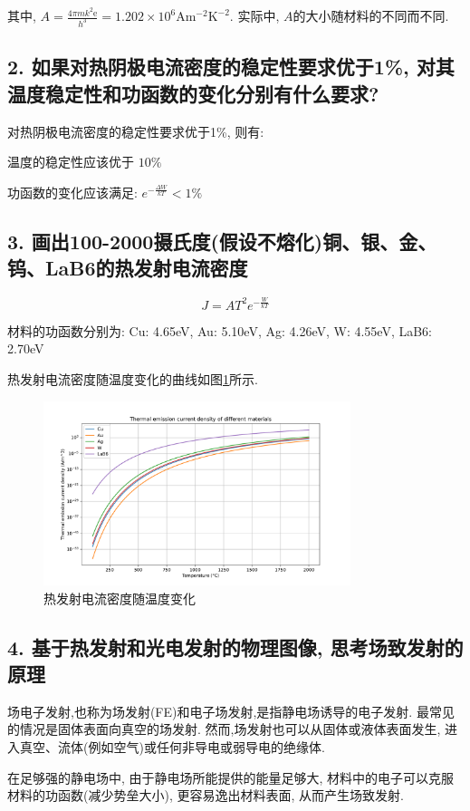 \documentclass{article}
\begin{document}
其中, $A = \frac{4\pi m k^2 \text{e}}{h^3}= 1.202 \times 10^6 \text{A}\text{m}^{-2}\text{K}^{-2}$. 实际中, $A$的大小随材料的不同而不同.

\subsection*{2. 如果对热阴极电流密度的稳定性要求优于1\%, 对其温度稳定性和功函数的变化分别有什么要求?}

对热阴极电流密度的稳定性要求优于1\%, 则有:

温度的稳定性应该优于 $10\%$

功函数的变化应该满足: $e^{-\frac{\Delta W}{kT}}<1\%$

\subsection*{3. 画出100-2000摄氏度(假设不熔化)铜、银、金、钨、LaB6的热发射电流密度}

$$J = A T^2 e^{-\frac{W}{kT}}$$

材料的功函数分别为: Cu: 4.65eV, Au: 5.10eV, Ag: 4.26eV, W: 4.55eV, LaB6: 2.70eV

热发射电流密度随温度变化的曲线如图\ref{fig:J-T}所示.

\begin{figure}[ht]
    \centering
    \includegraphics[width=0.8\textwidth]{img/J-T.pdf}
    \caption{热发射电流密度随温度变化}
    \label{fig:J-T}
\end{figure}

\subsection*{4. 基于热发射和光电发射的物理图像, 思考场致发射的原理}

场电子发射,也称为场发射(FE)和电子场发射,是指静电场诱导的电子发射. 最常见的情况是固体表面向真空的场发射. 然而,场发射也可以从固体或液体表面发生, 进入真空、流体(例如空气)或任何非导电或弱导电的绝缘体.\cite{Field-electron-emission}

在足够强的静电场中, 由于静电场所能提供的能量足够大, 材料中的电子可以克服材料的功函数(减少势垒大小), 更容易逸出材料表面, 从而产生场致发射.



\end{document}
